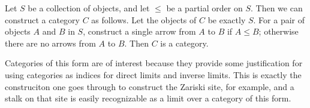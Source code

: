 \documentclass[12pt]{article}
\begin{document}
Let $S$ be a collection of objects, and let $\leq$ be a partial order on $S$.  Then we can construct a category $C$ as follows.  Let the objects of $C$ be exactly $S$.  For a pair of objects $A$ and $B$ in $S$, construct a single arrow from $A$ to $B$ if $A\leq B$; otherwise there are no arrows from $A$ to $B$.
Then $C$ is a category.  

Categories of this form are of interest because they provide some justification for using categories as indices for direct limits and inverse limits.  This is exactly the construciton one goes through to construct the Zariski site, for example, and a stalk on that site is easily recognizable as a limit over a category of this form.
\end{document}
